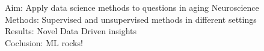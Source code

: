 Aim: Apply data science methods to questions in aging Neuroscience\\
Methods: Supervised and unsupervised methods in different settings\\
Results: Novel Data Driven insights\\
Coclusion: ML rocks!